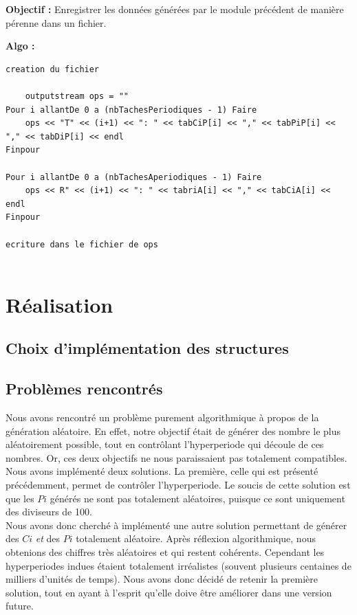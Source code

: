 		\textbf{Objectif :} Enregistrer les données générées par le module précédent de manière pérenne dans un fichier.
		
		\textbf{Algo :}
		\begin{lstlisting}
creation du fichier

	outputstream ops = ""
Pour i allantDe 0 a (nbTachesPeriodiques - 1) Faire
	ops << "T" << (i+1) << ": " << tabCiP[i] << "," << tabPiP[i] << "," << tabDiP[i] << endl
Finpour

Pour i allantDe 0 a (nbTachesAperiodiques - 1) Faire
	ops << R" << (i+1) << ": " << tabriA[i] << "," << tabCiA[i] << endl
Finpour

ecriture dans le fichier de ops
  
		\end{lstlisting}

\section{Réalisation}
	\subsection{Choix d'implémentation des structures}
	
	\subsection{Problèmes rencontrés}
		Nous avons rencontré un problème purement algorithmique à propos de la génération aléatoire. En effet, notre objectif était de générer des nombre le plus aléatoirement possible, tout en contrôlant l'hyperperiode qui découle de ces nombres. Or, ces deux objectifs ne nous paraissaient pas totalement compatibles.\\
		
		Nous avons implémenté deux solutions. La première, celle qui est présenté précédemment, permet de contrôler l'hyperperiode. Le soucis de cette solution est que les $Pi$ générés ne sont pas totalement aléatoires, puisque ce sont uniquement des diviseurs de 100.\\
		
		Nous avons donc cherché à implémenté une autre solution permettant de générer des $Ci$ \emph{et} des $Pi$ totalement aléatoire. Après réflexion algorithmique, nous obtenions des chiffres très aléatoires et qui restent cohérents. Cependant les hyperperiodes indues étaient totalement irréalistes (souvent plusieurs centaines de milliers d'unités de temps). Nous avons donc décidé de retenir la première solution, tout en ayant à l'esprit qu'elle doive être améliorer dans une version future.

